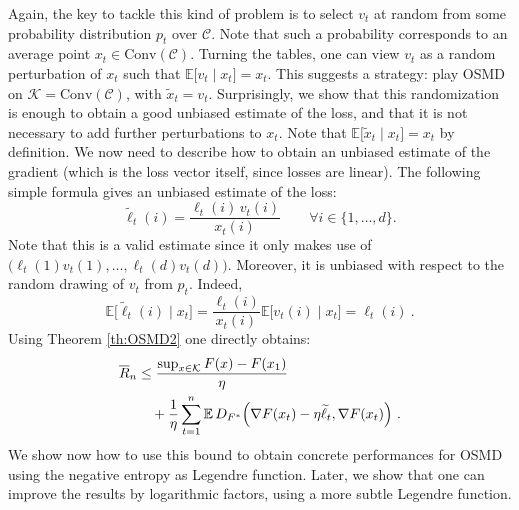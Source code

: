 \documentclass[11pt]{hackednow}
\newcommand{\E}{\mathbb{E}}
\newcommand{\cC}{\mathcal{C}}
\newcommand{\cK}{\mathcal{K}}
\newcommand{\oR}{\overline{R}}
\renewcommand{\tilde}{\widetilde}
\newcommand{\conv}{\mathrm{Conv}}
\begin{document}
Again, the key to tackle this kind of problem is to select $v_t$ at random from some probability distribution $p_t$ over $\cC$. Note that such a probability corresponds to an average point $x_t \in \conv(\cC)$. Turning the tables, one can view $v_t$ as a random perturbation of $x_t$ such that $\E\bigl[v_t \mid x_t\bigr] = x_t$. This suggests a strategy: play OSMD on $\cK=\conv(\cC)$, with $\tilde{x}_t = v_t$. Surprisingly, we show that this randomization is enough to obtain a good unbiased estimate of the loss, and that it is not necessary to add further perturbations to $x_t$. Note that $\E\bigl[\tilde{x}_t \mid x_t\bigr] = x_t$ by definition. We now need to describe how to obtain an unbiased estimate of the gradient (which is the loss vector itself, since losses are linear). The following simple formula gives an unbiased estimate of the loss:
\begin{equation} \label{eq:semibanditestimate}
\tilde{\ell}_t(i) = \frac{\ell_t(i)\,v_t(i)}{x_t(i)} \qquad \forall i \in \{1,\hdots, d\} .
\end{equation}
Note that this is a valid estimate since it only makes use of $\bigl(\ell_t(1) v_t(1), \hdots, \ell_t(d) v_t(d)\bigr)$. Moreover, it is unbiased with respect to the random drawing of $v_t$ from $p_t$. Indeed,
\[
    \E\bigl[\tilde{\ell}_t(i) \mid x_t\bigr] = \frac{\ell_t(i)}{x_t(i)}\E\bigl[v_t(i) \mid x_t\bigr] = \ell_t(i)~.
\]
Using Theorem \ref{th:OSMD2} one directly obtains:
\begin{align}
\nonumber
    \oR_n
&\le
    \frac{\sup_{x \in \cK} F(x) - F(x_1)}{\eta}
\\ &\quad + \frac{1}{\eta} \sum_{t=1}^n \E\, D_{F^*}\Bigl(\nabla F(x_t) - \eta \tilde{\ell}_t, \label{eq:semibanditregret}
\nabla F(x_t)\Bigr)~.
\end{align}
We show now how to use this bound to obtain concrete performances for OSMD using the negative entropy as Legendre function. Later, we show that one can improve the results by logarithmic factors, using a more subtle Legendre function.
\end{document}
